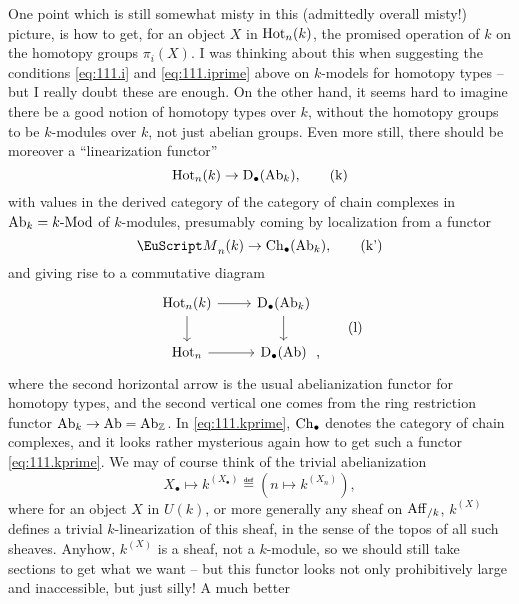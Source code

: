 One point which is still somewhat misty in this (admittedly overall
misty!) picture, is how to get, for an object $X$ in $\operatorname{Hot}_n(k)$,
the promised operation of $k$ on the homotopy groups $\pi_i(X)$. I was
thinking about this when suggesting the conditions \eqref{eq:111.i}
and \eqref{eq:111.iprime} above on $k$-models for homotopy types --
but I really doubt these are enough. On the other hand, it seems hard
to imagine there be a good notion of homotopy types over $k$, without
the homotopy groups to be $k$-modules over $k$, not just abelian
groups. Even more still, there should be moreover a ``linearization
functor''
\begin{equation}
  \label{eq:111.k}
  \operatorname{Hot}_n(k) \to {\ensuremath{\mathrm{D}}}_\bullet(\operatorname{Ab}_k),\tag{k}
\end{equation}
with values in the derived category of the category of chain complexes
in $\operatorname{Ab}_k= k\textup{-Mod}$ of $k$-modules, presumably coming by
localization from a functor
\begin{equation}
  \label{eq:111.kprime}
  \scrM_n(k)\to\Ch_\bullet(\AbOf_k),\tag{k'}
\end{equation}
and giving rise to a commutative diagram
\begin{equation}
  \label{eq:111.l}
  \begin{tabular}{@{}c@{}}
    \begin{tikzcd}[baseline=(O.base)]
      \HotOf_n(k)\ar[r]\ar[d] & \D_\bullet(\AbOf_k)\ar[d] \\
      \HotOf_n\ar[r] & |[alias=O]| \D_\bullet\Ab      
    \end{tikzcd},
  \end{tabular}\tag{l}
\end{equation}
where the second horizontal arrow is the usual abelianization functor
for homotopy types, and the second vertical one comes from the ring
restriction functor $\operatorname{Ab}_k\to\operatorname{Ab}=\operatorname{Ab}_{\mathbb{Z}}$. In
\eqref{eq:111.kprime}, ${\mathrm{Ch}}_\bullet$ denotes the category of chain
complexes, and it looks rather mysterious again how to get such a
functor \eqref{eq:111.kprime}. We may of course think of the trivial
abelianization
\[X_\bullet \mapsto k^{(X_\bullet)} \eqdef (n\mapsto k^{(X_n)}),\]
where for an object $X$ in $U(k)$, or more generally any sheaf on
$\operatorname{Aff}_{/k}$, $k^{(X)}$ defines a trivial $k$-linearization of this
sheaf, in the sense of the topos of all such sheaves. Anyhow,
$k^{(X)}$ is a sheaf, not a $k$-module, so we should still take
sections to get what we want -- but this functor looks not only
prohibitively large and inaccessible, but just silly! A much better
